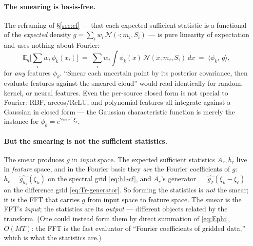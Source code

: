 \documentclass[11pt]{article}
\newcommand{\Eq}[1][q]{\mathbb{E}_{#1}}
\begin{document}
\paragraph{The smearing is basis-free.}
The reframing of \S\ref{sec:cf} --- that each expected sufficient
statistic is a functional of the \emph{expected} density
$g=\sum_i w_i\,\mathcal{N}(\cdot;m_i,S_i)$ --- is pure linearity of
expectation and uses nothing about Fourier:
\begin{equation}
\Eq\Big[\sum_i w_i\,\phi_k(x_i)\Big]
\;=\; \sum_i w_i\!\int \phi_k(x)\,\mathcal{N}(x;m_i,S_i)\,dx
\;=\; \langle \phi_k,\,g\rangle,
\label{eq:basis-free}
\end{equation}
for \emph{any} features $\phi_k$.  ``Smear each uncertain point by its
posterior covariance, then evaluate features against the smeared
cloud'' would read identically for random, kernel, or neural features.
Even the per-source closed form is not special to Fourier: RBF,
arccos/ReLU, and polynomial features all integrate against a Gaussian
in closed form --- the Gaussian characteristic function is merely the
instance for $\phi_k=e^{2\pi i\,x^\top\xi_k}$.

\paragraph{But the smearing is not the sufficient statistics.}
The smear produces $g$ in \emph{input} space.  The expected sufficient
statistics $A_r,h_r$ live in \emph{feature} space, and in the Fourier
basis they \emph{are} the Fourier coefficients of $g$:
$h_r=\widehat{g_{h_1}}(\xi_k)$ on the spectral grid \eqref{eq:h1-cf},
and $A_r$'s generator $=\widehat{g_T}(\xi_k-\xi_\ell)$ on the difference
grid \eqref{eq:Tr-generator}.  So forming the statistics is \emph{not}
the smear; it is the FFT that carries $g$ from input space to feature
space.  The smear is the FFT's \emph{input}; the statistics are its
\emph{output} --- different objects related by the transform.  (One
could instead form them by direct summation of \eqref{eq:Ephi},
$O(MT)$; the FFT is the fast evaluator of ``Fourier coefficients of
gridded data,'' which is what the statistics are.)
\end{document}
